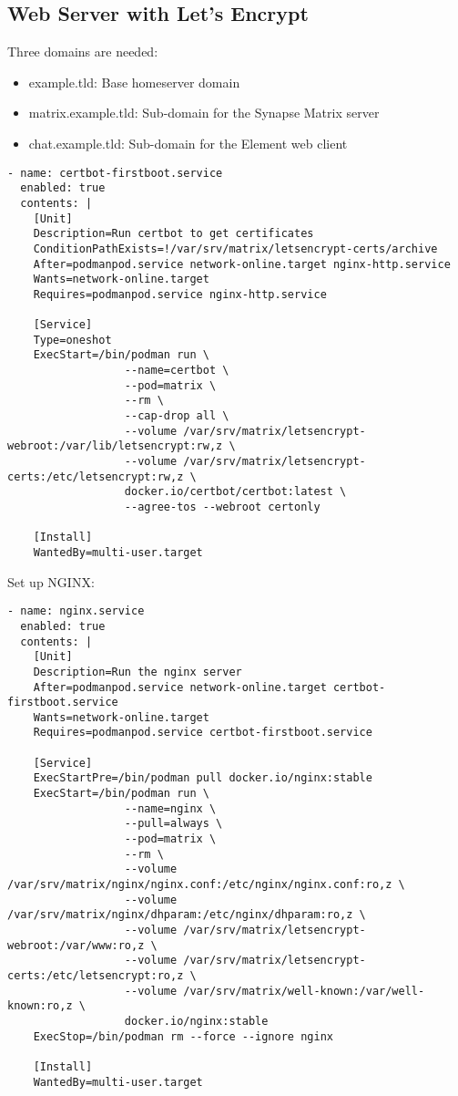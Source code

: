 \documentclass{article}
\begin{document}
\subsection{Web Server with Let's Encrypt}
Three domains are needed: 
\begin{itemize}
\item example.tld: Base homeserver domain
\item matrix.example.tld: Sub-domain for the Synapse Matrix server
\item chat.example.tld: Sub-domain for the Element web client 

\end{itemize}
\begin{lstlisting}
- name: certbot-firstboot.service
  enabled: true
  contents: |
    [Unit]
    Description=Run certbot to get certificates
    ConditionPathExists=!/var/srv/matrix/letsencrypt-certs/archive
    After=podmanpod.service network-online.target nginx-http.service
    Wants=network-online.target
    Requires=podmanpod.service nginx-http.service

    [Service]
    Type=oneshot
    ExecStart=/bin/podman run \
                  --name=certbot \
                  --pod=matrix \
                  --rm \
                  --cap-drop all \
                  --volume /var/srv/matrix/letsencrypt-webroot:/var/lib/letsencrypt:rw,z \
                  --volume /var/srv/matrix/letsencrypt-certs:/etc/letsencrypt:rw,z \
                  docker.io/certbot/certbot:latest \
                  --agree-tos --webroot certonly

    [Install]
    WantedBy=multi-user.target
\end{lstlisting}

Set up NGINX: 

\begin{lstlisting}
- name: nginx.service
  enabled: true
  contents: |
    [Unit]
    Description=Run the nginx server
    After=podmanpod.service network-online.target certbot-firstboot.service
    Wants=network-online.target
    Requires=podmanpod.service certbot-firstboot.service

    [Service]
    ExecStartPre=/bin/podman pull docker.io/nginx:stable
    ExecStart=/bin/podman run \
                  --name=nginx \
                  --pull=always \
                  --pod=matrix \
                  --rm \
                  --volume /var/srv/matrix/nginx/nginx.conf:/etc/nginx/nginx.conf:ro,z \
                  --volume /var/srv/matrix/nginx/dhparam:/etc/nginx/dhparam:ro,z \
                  --volume /var/srv/matrix/letsencrypt-webroot:/var/www:ro,z \
                  --volume /var/srv/matrix/letsencrypt-certs:/etc/letsencrypt:ro,z \
                  --volume /var/srv/matrix/well-known:/var/well-known:ro,z \
                  docker.io/nginx:stable
    ExecStop=/bin/podman rm --force --ignore nginx

    [Install]
    WantedBy=multi-user.target
\end{lstlisting}
\end{document}
